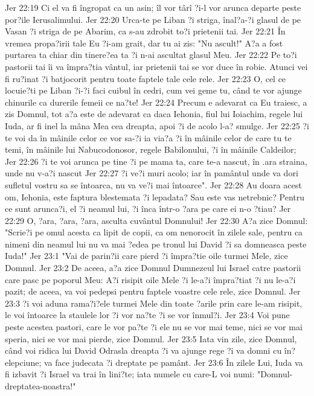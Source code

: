 Jer 22:19  Ci el va fi îngropat ca un asin; îl vor târî ?i-l vor arunca departe peste por?ile Ierusalimului.
Jer 22:20  Urca-te pe Liban ?i striga, înal?a-?i glasul de pe Vasan ?i striga de pe Abarim, ca s-au zdrobit to?i prietenii tai.
Jer 22:21  În vremea propa?irii tale Eu ?i-am grait, dar tu ai zis: "Nu ascult!" A?a a fost purtarea ta chiar din tinere?ea ta ?i n-ai ascultat glasul Meu.
Jer 22:22  Pe to?i pastorii tai îi va împra?tia vântul, iar prietenii tai se vor duce în robie. Atunci vei fi ru?inat ?i batjocorit pentru toate faptele tale cele rele.
Jer 22:23  O, cel ce locuie?ti pe Liban ?i-?i faci cuibul în cedri, cum vei geme tu, când te vor ajunge chinurile ca durerile femeii ce na?te!
Jer 22:24  Precum e adevarat ca Eu traiesc, a zis Domnul, tot a?a este de adevarat ca daca Iehonia, fiul lui Ioiachim, regele lui Iuda, ar fi inel la mâna Mea cea dreapta, apoi ?i de acolo l-a? smulge.
Jer 22:25  ?i te voi da în mâinile celor ce vor sa-?i ia via?a ?i în mâinile celor de care tu te temi, în mâinile lui Nabucodonosor, regele Babilonului, ?i în mâinile Caldeilor;
Jer 22:26  ?i te voi arunca pe tine ?i pe mama ta, care te-a nascut, în .ara straina, unde nu v-a?i nascut
Jer 22:27  ?i ve?i muri acolo; iar în pamântul unde va dori sufletul vostru sa se întoarca, nu va ve?i mai întoarce".
Jer 22:28  Au doara acest om, Iehonia, este faptura blestemata ?i lepadata? Sau este vas netrebnic? Pentru ce sunt arunca?i, el ?i neamul lui, ?i înca într-o ?ara pe care ei n-o ?tiau?
Jer 22:29  O, ?ara, ?ara, ?ara, asculta cuvântul Domnului!
Jer 22:30  A?a zice Domnul: "Scrie?i pe omul acesta ca lipit de copii, ca om nenorocit în zilele sale, pentru ca nimeni din neamul lui nu va mai ?edea pe tronul lui David ?i sa domneasca peste Iuda!"
Jer 23:1  "Vai de parin?ii care pierd ?i împra?tie oile turmei Mele, zice Domnul.
Jer 23:2  De aceea, a?a zice Domnul Dumnezeul lui Israel catre pastorii care pasc pe poporul Meu: A?i risipit oile Mele ?i le-a?i împra?tiat ?i nu le-a?i pazit; de aceea, va voi pedepsi pentru faptele voastre cele rele, zice Domnul.
Jer 23:3  ?i voi aduna rama?i?ele turmei Mele din toate ?arile prin care le-am risipit, le voi întoarce la staulele lor ?i vor na?te ?i se vor înmul?i.
Jer 23:4  Voi pune peste acestea pastori, care le vor pa?te ?i ele nu se vor mai teme, nici se vor mai speria, nici se vor mai pierde, zice Domnul.
Jer 23:5  Iata vin zile, zice Domnul, când voi ridica lui David Odrasla dreapta ?i va ajunge rege ?i va domni cu în?elepciune; va face judecata ?i dreptate pe pamânt.
Jer 23:6  În zilele Lui, Iuda va fi izbavit ?i Israel va trai în lini?te; iata numele cu care-L voi numi: "Domnul-dreptatea-noastra!"
